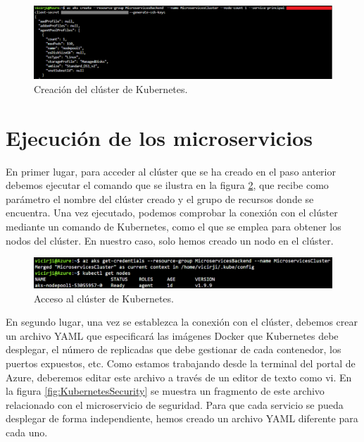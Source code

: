 \documentclass[11pt,spanish,listoffigures]{tfgetsinf}
\begin{document}
\begin{figure}[h]
\centering
\includegraphics[scale=0.5]{CreateCluster}
\caption{Creación del clúster de Kubernetes.}
\label{fig:CreateCluster}
\end{figure}

\section{Ejecución de los microservicios}


En primer lugar, para acceder al clúster que se ha creado en el paso anterior debemos ejecutar el comando que se ilustra en la figura \ref{fig:AccessCluster}, que recibe como parámetro el nombre del clúster creado y el grupo de recursos donde se encuentra. Una vez ejecutado, podemos comprobar la conexión con el clúster mediante un comando de Kubernetes, como el que se emplea para obtener los nodos del clúster. En nuestro caso, solo hemos creado un nodo en el clúster.

\begin{figure}[h]
\centering
\includegraphics[scale=0.6]{AccessCluster}
\caption{Acceso al clúster de Kubernetes.}
\label{fig:AccessCluster}
\end{figure}

En segundo lugar, una vez se establezca la conexión con el clúster, debemos crear un archivo YAML que especificará las imágenes Docker que Kubernetes debe desplegar, el número de replicadas que debe gestionar de cada contenedor, los puertos expuestos, etc. Como estamos trabajando desde la terminal del portal de Azure, deberemos editar este archivo a través de un editor de texto como vi. En la figura \ref{fig:KubernetesSecurity} se muestra un fragmento de este archivo relacionado con el microservicio de seguridad. Para que cada servicio se pueda desplegar de forma independiente, hemos creado un archivo YAML diferente para cada uno.
\end{document}
